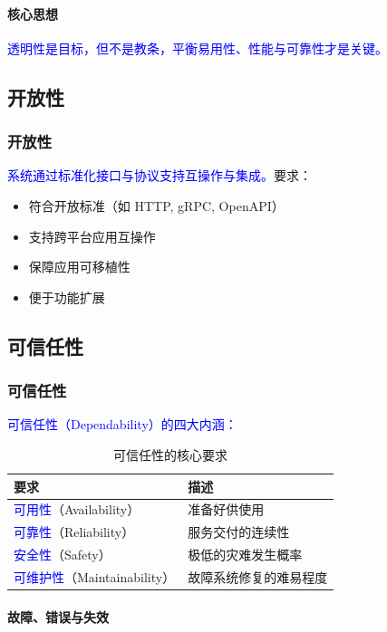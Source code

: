 \documentclass[UTF8,a4paper,11pt]{ctexart}
\newcommand{\blue}[1]{\textcolor{blue}{#1}}
\begin{document}
\paragraph{核心思想}
\blue{透明性是目标，但不是教条，平衡易用性、性能与可靠性才是关键。}

\subsection{开放性}

\subsubsection*{开放性}

\blue{系统通过标准化接口与协议支持互操作与集成。}要求：
\begin{itemize}
  \item 符合开放标准（如 HTTP, gRPC, OpenAPI）
  \item 支持跨平台应用互操作
  \item 保障应用可移植性
  \item 便于功能扩展
\end{itemize}

\subsection{可信任性}

\subsubsection*{可信任性}

\blue{可信任性（Dependability）的四大内涵：}

\begin{table}[H]
\centering
\caption{可信任性的核心要求}
\begin{tabularx}{\textwidth}{>{\raggedright\arraybackslash}p{}X}
\toprule
\textbf{要求} & \textbf{描述} \\
\midrule
\blue{可用性}（Availability） & 准备好供使用 \\
\blue{可靠性}（Reliability） & 服务交付的连续性 \\
\blue{安全性}（Safety） & 极低的灾难发生概率 \\
\blue{可维护性}（Maintainability） & 故障系统修复的难易程度 \\
\bottomrule
\end{tabularx}
\end{table}

\paragraph{故障、错误与失效}
\end{document}
